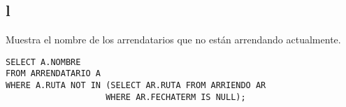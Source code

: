 \documentclass{templateNote}
\begin{document}
\subsection{l}
\indent
Muestra el nombre de los arrendatarios que no están arrendando actualmente.
\begin{tcolorbox}
    [colback=gray!5!white,colframe=gray!75!black,fonttitle=\bfseries,title=SQL]
    \begin{sqlcode}
    \end{sqlcode}
    \begin{verbatim}
SELECT A.NOMBRE
FROM ARRENDATARIO A
WHERE A.RUTA NOT IN (SELECT AR.RUTA FROM ARRIENDO AR
                    WHERE AR.FECHATERM IS NULL);
    \end{verbatim}
\end{tcolorbox}
\end{document}
